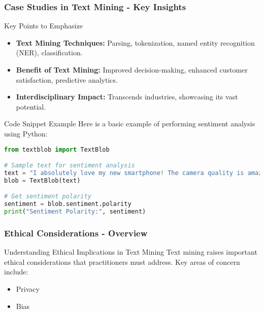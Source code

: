 \documentclass[aspectratio=169]{beamer}
\begin{document}
\begin{frame}[fragile]
  \frametitle{Case Studies in Text Mining - Key Insights}
  \begin{block}{Key Points to Emphasize}
    \begin{itemize}
      \item \textbf{Text Mining Techniques:} Parsing, tokenization, named entity recognition (NER), classification.
      \item \textbf{Benefit of Text Mining:} Improved decision-making, enhanced customer satisfaction, predictive analytics.
      \item \textbf{Interdisciplinary Impact:} Transcends industries, showcasing its vast potential.
    \end{itemize}
  \end{block}

  \begin{block}{Code Snippet Example}
    Here is a basic example of performing sentiment analysis using Python:
    \begin{lstlisting}[language=Python]
from textblob import TextBlob

# Sample text for sentiment analysis
text = "I absolutely love my new smartphone! The camera quality is amazing."
blob = TextBlob(text)

# Get sentiment polarity
sentiment = blob.sentiment.polarity
print("Sentiment Polarity:", sentiment)
    \end{lstlisting}
  \end{block}
\end{frame}

\begin{frame}[fragile]
  \frametitle{Ethical Considerations - Overview}
  \begin{block}{Understanding Ethical Implications in Text Mining}
    Text mining raises important ethical considerations that practitioners must address. Key areas of concern include:
    \begin{itemize}
        \item Privacy
        \item Bias
    \end{itemize}
  \end{block}
\end{frame}
\end{document}
